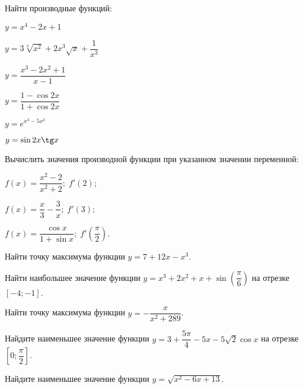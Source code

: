 \begin{consultation}
	\begin{listofex}
		\item Найти производные функций:
		\begin{enumcols}[itemcolumns=2]
			\item \( y=x^4-2x+1 \)
			\item \( y=3\sqrt[3]{x^2}+2x^3\sqrt{x}+\dfrac{1}{x^3} \)
			\item \( y=\dfrac{x^3-2x^2+1}{x-1} \)
			\item \( y=\dfrac{1-\cos2x}{1+\cos2x} \)
			\item \( y=e^{x^3-5x^2} \)
			\item \( y=\sin2x\tg x \)
		\end{enumcols}
		\item Вычислить значения производной функции при указанном значении переменной:
		\begin{enumcols}[itemcolumns=3]
			\item \( f(x)=\dfrac{x^2-2}{x^2+2};\;f'(2) \);
			\item \( f(x)=\dfrac{x}{3}-\dfrac{3}{x};\;f'(3) \);
			\item \( f(x)=\dfrac{\cos x}{1+\sin x};\;f'\left( \dfrac{\pi}{2} \right) \).
		\end{enumcols}
		\item Найти точку максимума функции \( y=7+12x-x^3 \). 
		\item Найти наибольшее значение функции \( y=x^3+2x^2+x+\sin\left( \dfrac{\pi}{6} \right) \) на отрезке \( [-4;-1] \). 
		\item Найти точку максимума функции \( y=-\dfrac{x}{x^2+289} \). 
		\item Найдите наименьшее значение функции \( y=3+\dfrac{5\pi}{4}-5x-5\sqrt{2}\cos x \) на отрезке \( \left[ 0;\dfrac{\pi}{2} \right] \). 
		\item Найдите наименьшее значение функции \( y=\sqrt{x^2-6x+13} \). 
	\end{listofex}
\end{consultation}